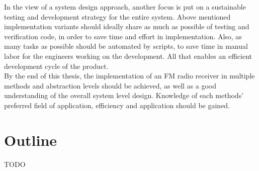 In the view of a system design approach, another focus is put on a sustainable testing and development strategy for the entire system.
Above mentioned implementation variants should ideally share as much as possible of testing and verification code, in order to save time and effort in implementation.
Also, as many tasks as possible should be automated by scripts, to save time in manual labor for the engineers working on the development.
All that enables an efficient development cycle of the product.\\

By the end of this thesis, the implementation of an FM radio receiver in multiple methods and abstraction levels should be achieved, as well as a good understanding of the overall system level design.
Knowledge of each methods' preferred field of application, efficiency and application should be gained.


\section{Outline}

TODO






